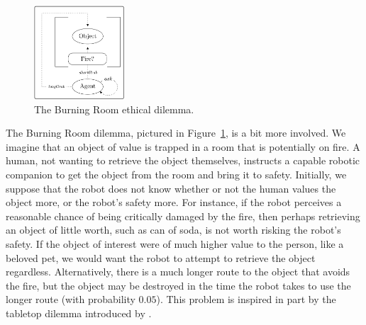 \documentclass[11pt]{article}
\begin{document}
\begin{figure}
\centering
\includegraphics[width=0.30\textwidth]{figures/burning_room.png}
\caption{The Burning Room ethical dilemma.}
\label{fig:burning_room}
\end{figure}

The Burning Room dilemma, pictured in Figure~\ref{fig:burning_room}, is a bit more involved. We imagine that an object of value is trapped in a room that is potentially on fire. A human, not wanting to retrieve the object themselves, instructs a capable robotic companion to get the object from the room and bring it to safety. Initially, we suppose that the robot does not know whether or not the human values the object more, or the robot's safety more. For instance, if the robot perceives a reasonable chance of being critically damaged by the fire, then perhaps retrieving an object of little worth, such as can of soda, is not worth risking the robot's safety. If the object of interest were of much higher value to the person, like a beloved pet, we would want the robot to attempt to retrieve the object regardless. Alternatively, there is a much longer route to the object that avoids the fire, but the object may be destroyed in the time the robot takes to use the longer route (with probability $0.05$). This problem is inspired in part by the tabletop dilemma introduced by \cite{briggs2015sorry}.
\end{document}
